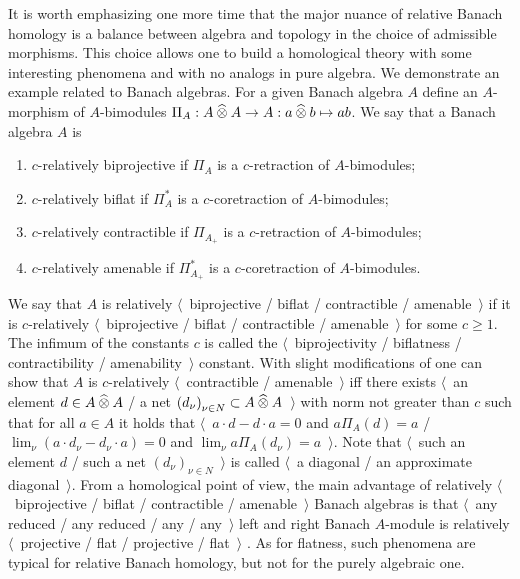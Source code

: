 It is worth emphasizing one more time that the major nuance of relative Banach
homology is a balance between algebra and topology in the choice of
admissible morphisms. This choice allows one to build a homological theory with
some interesting phenomena and with no analogs in pure algebra. We demonstrate an
example related to Banach algebras. For a given Banach algebra $A$ define an $A$-morphism 
of $A$-bimodules $\Pi_A:A\mathbin{\widehat{\otimes}} A\to A:a\mathbin{\widehat{\otimes}} b\mapsto ab$. We say 
that a Banach algebra $A$ is 
\begin{enumerate}[label = (\roman*)]
  \item $c$-relatively biprojective if $\Pi_A$ is a $c$-retraction of
  $A$-bimodules;

  \item $c$-relatively biflat if $\Pi_A^*$ is a $c$-coretraction of 
  $A$-bimodules;

  \item $c$-relatively contractible if $\Pi_{A_+}$ is a $c$-retraction of
  $A$-bimodules;

  \item $c$-relatively amenable if $\Pi_{A_+}^*$ is a $c$-coretraction of
  $A$-bimodules.
\end{enumerate}

We say that $A$ is relatively $\langle$~biprojective / biflat / contractible /
amenable~$\rangle$ if it is $c$-relatively $\langle$~biprojective / biflat /
contractible / amenable~$\rangle$ for some $c\geq 1$. The infimum of the
constants $c$ is called the $\langle$~biprojectivity / biflatness /
contractibility / amenability~$\rangle$ constant.  With slight modifications of
\cite[proposition 7.1.72]{HelBanLocConvAlg} one can show that $A$ is
$c$-relatively $\langle$~contractible / amenable~$\rangle$ iff there exists
$\langle$~an element $d\in A\mathbin{\widehat{\otimes}} A$ / a net 
${(d_\nu)}_{\nu\in N}\subset A\mathbin{\widehat{\otimes}} A$~$\rangle$ with 
norm not greater than $c$ such that for all $a\in A$ it holds that 
$\langle$~$a\cdot d-d\cdot a=0$ and $a\Pi_A(d)=a$ / 
$\lim_\nu(a\cdot d_\nu-d_\nu\cdot a)=0$ 
and $\lim_\nu a\Pi_A(d_\nu)=a$~$\rangle$. Note that 
$\langle$~such an element $d$ / such a net ${(d_\nu)}_{\nu\in N}$~$\rangle$ is called
$\langle$~a diagonal / an approximate diagonal~$\rangle$. From a homological point
of view, the main advantage of relatively $\langle$~biprojective / biflat /
contractible / amenable~$\rangle$ Banach algebras is that $\langle$~any reduced
/ any reduced / any / any~$\rangle$ left and right Banach $A$-module is
relatively $\langle$~projective / flat / projective / flat~$\rangle$
\cite[theorem 7.1.60]{HelBanLocConvAlg}. As for flatness, such phenomena are
typical for relative Banach homology, but not for the purely algebraic one.
